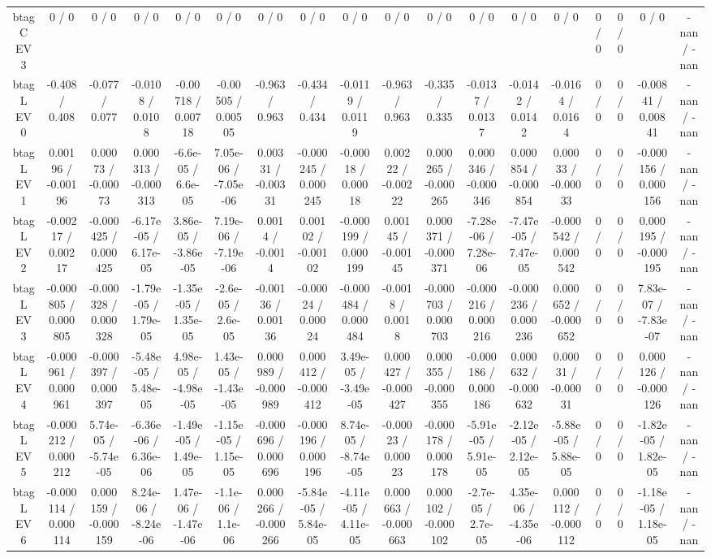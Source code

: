 \documentclass[10pt]{article}
\begin{document}
\begin{table}[htbp]
\begin{center}
\begin{tabular}{|c|c|c|c|c|c|c|c|c|c|c|c|c|c|c|c|c|c|}
  btag C EV 3 & 0 / 0 & 0 / 0 & 0 / 0 & 0 / 0 & 0 / 0 & 0 / 0 & 0 / 0 & 0 / 0 & 0 / 0 & 0 / 0 & 0 / 0 & 0 / 0 & 0 / 0 & 0 / 0 & 0 / 0 & 0 / 0 & -nan / -nan \\ 
  btag L EV 0 & -0.408 / 0.408 & -0.077 / 0.077 & -0.0108 / 0.0108 & -0.00718 / 0.00718 & -0.00505 / 0.00505 & -0.963 / 0.963 & -0.434 / 0.434 & -0.0119 / 0.0119 & -0.963 / 0.963 & -0.335 / 0.335 & -0.0137 / 0.0137 & -0.0142 / 0.0142 & -0.0164 / 0.0164 & 0 / 0 & 0 / 0 & -0.00841 / 0.00841 & -nan / -nan \\ 
  btag L EV 1 & 0.00196 / -0.00196 & 0.00073 / -0.00073 & 0.000313 / -0.000313 & -6.6e-05 / 6.6e-05 & 7.05e-06 / -7.05e-06 & 0.00331 / -0.00331 & -0.000245 / 0.000245 & -0.00018 / 0.00018 & 0.00222 / -0.00222 & 0.000265 / -0.000265 & 0.000346 / -0.000346 & 0.000854 / -0.000854 & 0.00033 / -0.00033 & 0 / 0 & 0 / 0 & -0.000156 / 0.000156 & -nan / -nan \\ 
  btag L EV 2 & -0.00217 / 0.00217 & -0.000425 / 0.000425 & -6.17e-05 / 6.17e-05 & 3.86e-05 / -3.86e-05 & 7.19e-06 / -7.19e-06 & 0.0014 / -0.0014 & 0.00102 / -0.00102 & -0.000199 / 0.000199 & 0.00145 / -0.00145 & 0.000371 / -0.000371 & -7.28e-06 / 7.28e-06 & -7.47e-05 / 7.47e-05 & -0.000542 / 0.000542 & 0 / 0 & 0 / 0 & 0.000195 / -0.000195 & -nan / -nan \\ 
  btag L EV 3 & -0.000805 / 0.000805 & -0.000328 / 0.000328 & -1.79e-05 / 1.79e-05 & -1.35e-05 / 1.35e-05 & -2.6e-05 / 2.6e-05 & -0.00136 / 0.00136 & -0.00024 / 0.00024 & -0.000484 / 0.000484 & -0.0018 / 0.0018 & -0.000703 / 0.000703 & -0.000216 / 0.000216 & -0.000236 / 0.000236 & 0.000652 / -0.000652 & 0 / 0 & 0 / 0 & 7.83e-07 / -7.83e-07 & -nan / -nan \\ 
  btag L EV 4 & -0.000961 / 0.000961 & -0.000397 / 0.000397 & -5.48e-05 / 5.48e-05 & 4.98e-05 / -4.98e-05 & 1.43e-05 / -1.43e-05 & 0.000989 / -0.000989 & 0.000412 / -0.000412 & 3.49e-05 / -3.49e-05 & 0.000427 / -0.000427 & 0.000355 / -0.000355 & -0.000186 / 0.000186 & 0.000632 / -0.000632 & 0.00031 / -0.00031 & 0 / 0 & 0 / 0 & 0.000126 / -0.000126 & -nan / -nan \\ 
  btag L EV 5 & -0.000212 / 0.000212 & 5.74e-05 / -5.74e-05 & -6.36e-06 / 6.36e-06 & -1.49e-05 / 1.49e-05 & -1.15e-05 / 1.15e-05 & -0.000696 / 0.000696 & -0.000196 / 0.000196 & 8.74e-05 / -8.74e-05 & -0.00023 / 0.00023 & -0.000178 / 0.000178 & -5.91e-05 / 5.91e-05 & -2.12e-05 / 2.12e-05 & -5.88e-05 / 5.88e-05 & 0 / 0 & 0 / 0 & -1.82e-05 / 1.82e-05 & -nan / -nan \\ 
  btag L EV 6 & -0.000114 / 0.000114 & 0.000159 / -0.000159 & 8.24e-06 / -8.24e-06 & 1.47e-06 / -1.47e-06 & -1.1e-06 / 1.1e-06 & 0.000266 / -0.000266 & -5.84e-05 / 5.84e-05 & -4.11e-05 / 4.11e-05 & 0.000663 / -0.000663 & 0.000102 / -0.000102 & -2.7e-05 / 2.7e-05 & 4.35e-06 / -4.35e-06 & 0.000112 / -0.000112 & 0 / 0 & 0 / 0 & -1.18e-05 / 1.18e-05 & -nan / -nan \\ 

\end{tabular}
\end{center}
\end{table}
\end{document}
